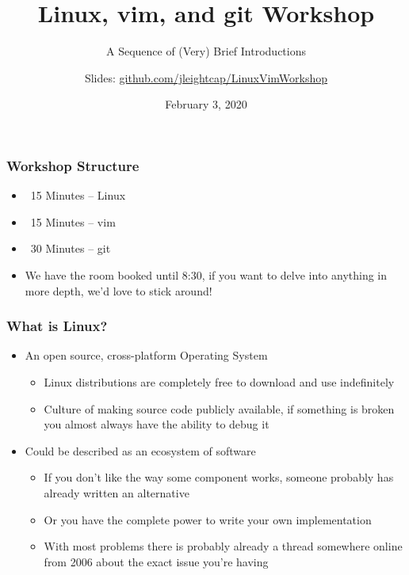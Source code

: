 \documentclass{beamer}
\title{Linux, vim, and git Workshop}
\subtitle{A Sequence of (Very) Brief Introductions}
\author{Slides: \hyperlink{igithub.com/jleightcap/LinuxVimWorkshop}{github.com/jleightcap/LinuxVimWorkshop}}
\institute{Wireless Club -- Jack Leightcap}
\date{February 3, 2020}
\begin{document}
\begin{frame}
  \titlepage
\end{frame}

\begin{frame}
  \frametitle{Workshop Structure}
  \begin{itemize}
    \item ~15 Minutes -- Linux
    \item ~15 Minutes -- vim
    \item ~30 Minutes -- git
    \item We have the room booked until 8:30, if you want to delve into anything in more depth, we'd love to stick around!
  \end{itemize}
\end{frame}

\begin{frame}
  \frametitle{What is Linux?}
  \begin{itemize}
    \item An open source, cross-platform  Operating System
      \begin{itemize}
        \item Linux distributions are completely free to download and use indefinitely
        \item Culture of making source code publicly available, if something is broken you almost always have the ability to debug it
      \end{itemize}
    \item Could be described as an ecosystem of software
      \begin{itemize}
        \item If you don't like the way some component works, someone probably has already written an alternative
        \item Or you have the complete power to write your own implementation
        \item With most problems there is probably already a thread somewhere online from 2006 about the exact issue you're having
      \end{itemize}
  \end{itemize}
\end{frame}
\end{document}
